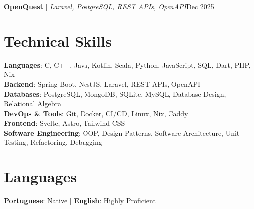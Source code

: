 \begin{resumeSubHeadingList}
  \resumeProjectHeading%
  {{\textbf{\href{https://github.com/peucastro/lbaw}{OpenQuest}}
  $|$ \emph{Laravel, PostgreSQL, REST APIs, OpenAPI}}}{Dec 2025}
  \begin{resumeItemList}
  \end{resumeItemList}

\end{resumeSubHeadingList}

\section{Technical Skills}
\begin{itemize}[leftmargin=0in, label={}]
    \small{
    \item{
        \textbf{Languages}{: C, C++, Java, Kotlin, Scala, Python,
        JavaScript, SQL, Dart, PHP, Nix} \\
        \textbf{Backend}{: Spring Boot, NestJS, Laravel, REST APIs,
        OpenAPI} \\
        \textbf{Databases}{: PostgreSQL, MongoDB, SQLite, MySQL,
        Database Design, Relational Algebra} \\
        \textbf{DevOps \& Tools}{: Git, Docker, CI/CD, Linux, Nix,
        Caddy} \\
        \textbf{Frontend}{: Svelte, Astro, Tailwind CSS} \\
        \textbf{Software Engineering}{: OOP, Design Patterns,
        Software Architecture, Unit Testing, Refactoring, Debugging}
    }}
\end{itemize}

\section{Languages}
\begin{itemize}[leftmargin=0in, label={}]
    \small{
    \item{
        \textbf{Portuguese}{: Native} $|$
        \textbf{English}{: Highly Proficient}
    }}
\end{itemize}


